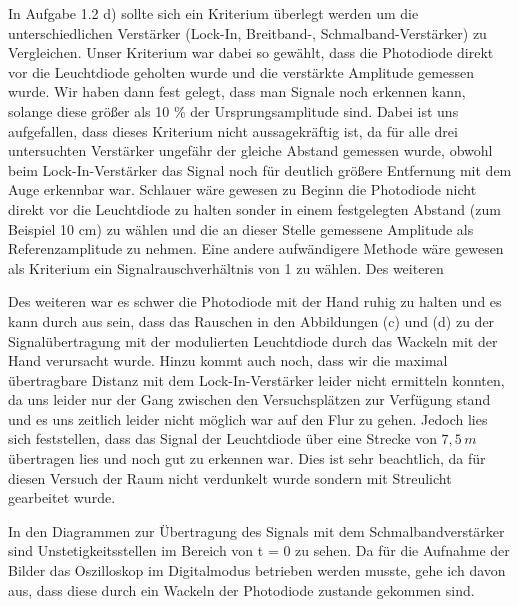 \documentclass{scrartcl}						%
\begin{document}
	In Aufgabe 1.2 d) sollte sich ein Kriterium überlegt werden um die unterschiedlichen Verstärker (Lock-In, Breitband-, Schmalband-Verstärker) zu Vergleichen. Unser Kriterium war dabei so gewählt, dass die Photodiode direkt vor die Leuchtdiode geholten wurde und die verstärkte Amplitude gemessen wurde. Wir haben dann fest gelegt, dass man Signale noch erkennen kann, solange diese größer als 10 \% der Ursprungsamplitude sind. Dabei ist uns aufgefallen, dass dieses Kriterium nicht aussagekräftig ist, da für alle drei untersuchten Verstärker ungefähr der gleiche Abstand gemessen wurde, obwohl beim Lock-In-Verstärker das Signal noch für deutlich größere Entfernung mit dem Auge erkennbar war. Schlauer wäre gewesen zu Beginn die Photodiode nicht direkt vor die Leuchtdiode zu halten sonder in einem festgelegten Abstand (zum Beispiel 10 cm) zu wählen und die an dieser Stelle gemessene Amplitude als Referenzamplitude zu nehmen. Eine andere aufwändigere Methode wäre gewesen als Kriterium ein Signalrauschverhältnis von 1 zu wählen. Des weiteren 
	
	Des weiteren war es schwer die Photodiode mit der Hand ruhig zu halten und es kann durch aus sein, dass das Rauschen in den Abbildungen (c) und (d) zu der Signalübertragung mit der modulierten Leuchtdiode durch das Wackeln mit der Hand verursacht wurde. Hinzu kommt auch noch, dass wir die maximal übertragbare Distanz mit dem Lock-In-Verstärker leider nicht ermitteln konnten, da uns leider nur der Gang zwischen den Versuchsplätzen zur Verfügung stand und es uns zeitlich leider nicht möglich war auf den Flur zu gehen. Jedoch lies sich feststellen, dass das Signal der Leuchtdiode über eine Strecke von $ 7,5 \, m $ übertragen lies und noch gut zu erkennen war. Dies ist sehr beachtlich, da für diesen Versuch der Raum nicht verdunkelt wurde sondern mit Streulicht gearbeitet wurde.
	
	In den Diagrammen zur Übertragung des Signals mit dem Schmalbandverstärker sind Unstetigkeitsstellen im Bereich von t = 0 zu sehen. Da für die Aufnahme der Bilder das Oszilloskop im Digitalmodus betrieben werden musste, gehe ich davon aus, dass diese durch ein Wackeln der Photodiode zustande gekommen sind. 
				
\end{document}
